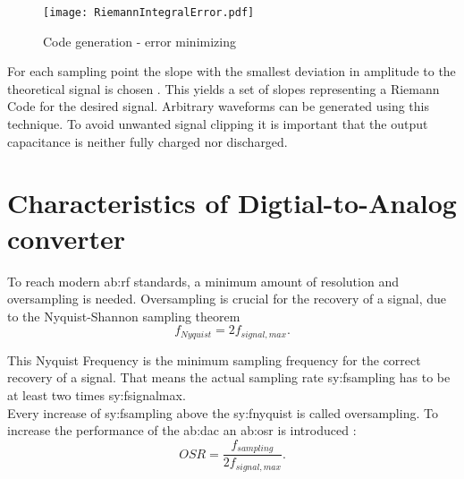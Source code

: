  \begin{figure}[ht]
	\centering
  \texttt{[image: RiemannIntegralError.pdf]}
	\caption{Code generation - error minimizing}
	\label{fig:RiemannIntegralError}
\end{figure}
For each sampling point the slope with the smallest deviation in amplitude to the theoretical signal is chosen \cite{VeyracRivetDevalEtAl2014}.
This yields a set of slopes representing a Riemann Code for the desired signal.
Arbitrary waveforms can be generated using this technique.
To avoid unwanted signal clipping it is important that the output capacitance is neither fully charged nor discharged.
\newpage
\section{Characteristics of Digtial-to-Analog converter}
\label{ch:characteristics}
To reach modern \gls{ab:rf} standards, a minimum amount of resolution and oversampling is needed.
Oversampling is crucial for the recovery of a signal, due to the Nyquist-Shannon sampling theorem
\begin{equation}
f_{Nyquist} = 2 f_{signal,max}.
\end{equation}
\label{eq:SamplingTheorem}

This Nyquist Frequency is the minimum sampling frequency for the correct recovery of a signal.
That means the actual sampling rate \gls{sy:fsampling} has to be at least two times \gls{sy:fsignalmax}.\\
Every increase of \gls{sy:fsampling} above the \gls{sy:fnyquist} is called oversampling.
To increase the performance of the \gls{ab:dac} an \gls{ab:osr} is introduced \cite{DevalRivetVeyrac2015}:
\begin{equation}
OSR = \frac{f_{sampling}}{2 f_{signal,max}}.
\end{equation}

